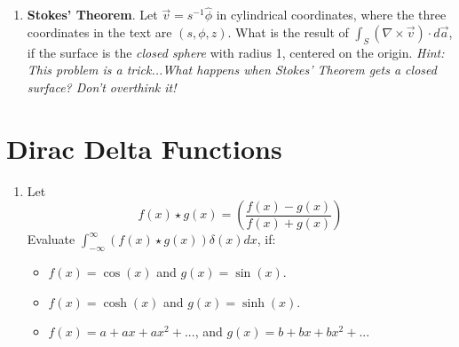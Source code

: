 \documentclass[10pt]{article}
\begin{document}
\begin{enumerate}
\item \textbf{Stokes' Theorem}.  Let $\vec{v} = s^{-1} \hat{\phi}$ in cylindrical coordinates, where the three coordinates in the text are $(s,\phi,z)$.  What is the result of $\int_{S} (\nabla \times \vec{v}) \cdot d\vec{a}$, if the surface is the \textit{closed sphere} with radius 1, centered on the origin.  \textit{Hint: This problem is a trick...What happens when Stokes' Theorem gets a closed surface?  Don't overthink it!}
\end{enumerate}

\clearpage

\section{Dirac Delta Functions}

\begin{enumerate}
\item Let
\begin{equation}
f(x) \star g(x) = \left(\frac{f(x) - g(x)}{f(x) + g(x)}\right)
\end{equation}
Evaluate $\int_{-\infty}^{\infty} (f(x) \star g(x)) \delta(x) dx$, if:
\begin{itemize}
\item $f(x) = \cos(x)$ and $g(x) = \sin(x)$.
\item $f(x) = \cosh(x)$ and $g(x) = \sinh(x)$.
\item $f(x) = a + ax + ax^2 + ...$, and $g(x) = b + bx + bx^2 + ...$
\end{itemize}
\end{enumerate}
\end{document}
